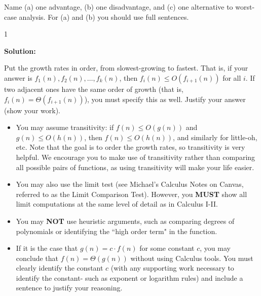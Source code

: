 \documentclass[9pt]{article}
\def\solutions{1}
\begin{document}
\item Name (a) one advantage, (b) one disadvantage, and (c) one alternative to worst-case analysis. For (a) and (b) you should use full sentences.

  \if\solutions1
  \vspace{2mm}
  
  \textbf{Solution:}   \\


\fi

\newpage




\vspace{5mm}

\item 
Put the growth rates in order, from slowest-growing to fastest. That is, if your answer is $f_1(n), f_2(n), \dotsc, f_k(n)$, then $f_i(n) \leq O(f_{i+1}(n))$ for all $i$. If two adjacent ones have the same order of growth (that is, $f_i(n) = \Theta(f_{i+1}(n))$), you must specify this as well. Justify your answer (show your work). 
\begin{itemize}
\item You may assume transitivity: if $f(n) \leq O(g(n))$ and $g(n) \leq O(h(n))$, then $f(n) \leq O(h(n))$, and similarly for little-oh, etc. Note that the goal is to order the growth rates, so transitivity is very helpful. We encourage you to make use of transitivity rather than comparing all possible pairs of functions, as using transitivity will make your life easier.

\item You may also use the limit test (see Michael's Calculus Notes on Canvas, referred to as the Limit Comparison Test). However, you \textbf{MUST} show all limit computations at the same level of detail as in Calculus I-II.
\item You may \textbf{NOT} use heuristic arguments, such as comparing degrees of polynomials or identifying the ``high order term" in the function.
\item If it is the case that $g(n) = c \cdot f(n)$ for some constant $c$, you may conclude that $f(n) = \Theta(g(n))$ without using Calculus tools. You must clearly identify the constant $c$ (with any supporting work necessary to identify the constant- such as exponent or logarithm rules) and include a sentence to justify your reasoning. 
\end{itemize}
\end{document}
